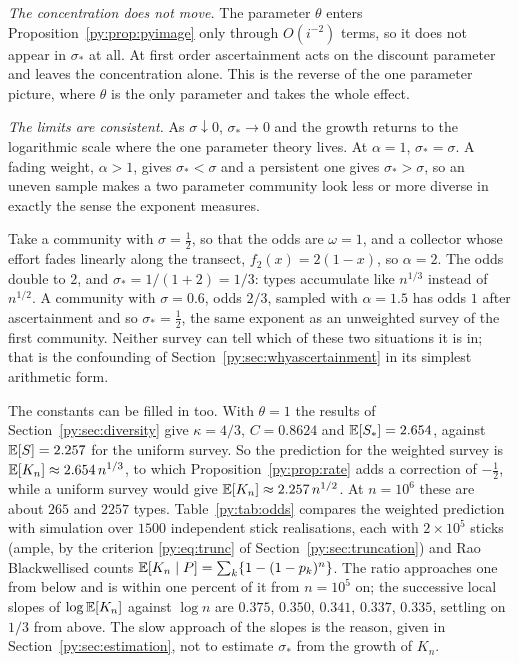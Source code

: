\emph{The concentration does not move.} The parameter $\theta$ enters
Proposition~\ref{py:prop:pyimage} only through $O(i^{-2})$ terms, so it does not appear in $\sigma_*$
at all. At first order ascertainment acts on the discount parameter and leaves the concentration
alone. This is the reverse of the one parameter picture, where $\theta$ is the only parameter and
takes the whole effect.

\emph{The limits are consistent.} As $\sigma \downarrow 0$, $\sigma_* \to 0$ and the growth returns
to the logarithmic scale where the one parameter theory lives. At $\alpha = 1$, $\sigma_* = \sigma$.
A fading weight, $\alpha > 1$, gives $\sigma_* < \sigma$ and a persistent one gives
$\sigma_* > \sigma$, so an uneven sample makes a two parameter community look less or more diverse
in exactly the sense the exponent measures.

\begin{example}
\label{py:ex:odds}
Take a community with $\sigma = \tfrac12$, so that the odds are $\omega = 1$, and a collector whose
effort fades linearly along the transect, $f_2(x) = 2(1-x)$, so $\alpha = 2$. The odds double to
$2$, and $\sigma_* = 1/(1+2) = 1/3$: types accumulate like $n^{1/3}$ instead of $n^{1/2}$. A
community with $\sigma = 0.6$, odds $2/3$, sampled with $\alpha = 1.5$ has odds $1$ after
ascertainment and so $\sigma_* = \tfrac12$, the same exponent as an unweighted survey of the first
community. Neither survey can tell which of these two situations it is in; that is the confounding
of Section~\ref{py:sec:whyascertainment} in its simplest arithmetic form.

The constants can be filled in too. With $\theta = 1$ the results of
Section~\ref{py:sec:diversity} give $\kappa = 4/3$, $C = 0.8624$ and $\mathbb{E}[S_*] = 2.654$, against
$\mathbb{E}[S] = 2.257$ for the uniform survey. So the prediction for the weighted survey is
$\mathbb{E}[K_n] \approx 2.654\,n^{1/3}$, to which Proposition~\ref{py:prop:rate} adds a correction of
$-\tfrac12$, while a uniform survey would give $\mathbb{E}[K_n] \approx 2.257\,n^{1/2}$. At $n = 10^{6}$
these are about $265$ and $2257$ types. Table~\ref{py:tab:odds} compares the weighted prediction
with simulation over $1500$ independent stick realisations, each with $2\times10^{5}$ sticks
(ample, by the criterion \eqref{py:eq:trunc} of Section~\ref{py:sec:truncation}) and Rao
Blackwellised counts $\mathbb{E}[K_n\mid P] = \sum_k\{1-(1-p_k)^n\}$. The ratio approaches one from below
and is within one percent of it from $n = 10^{5}$ on; the successive local slopes of
$\log\mathbb{E}[K_n]$ against $\log n$ are $0.375$, $0.350$, $0.341$, $0.337$, $0.335$, settling on
$1/3$ from above. The slow approach of the slopes is the reason, given in
Section~\ref{py:sec:estimation}, not to estimate $\sigma_*$ from the growth of $K_n$.
\end{example}


